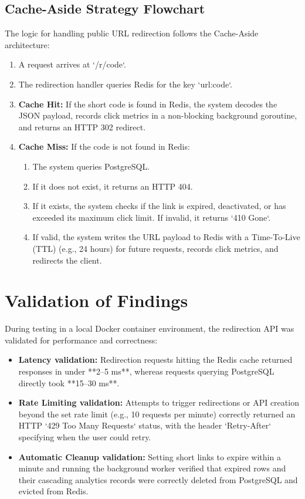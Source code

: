 \subsection{Cache-Aside Strategy Flowchart}
The logic for handling public URL redirection follows the Cache-Aside architecture:
\begin{enumerate}
    \item A request arrives at `/r/{code}`.
    \item The redirection handler queries Redis for the key `url:{code}`.
    \item \textbf{Cache Hit:} If the short code is found in Redis, the system decodes the JSON payload, records click metrics in a non-blocking background goroutine, and returns an HTTP 302 redirect.
    \item \textbf{Cache Miss:} If the code is not found in Redis:
    \begin{enumerate}
        \item The system queries PostgreSQL.
        \item If it does not exist, it returns an HTTP 404.
        \item If it exists, the system checks if the link is expired, deactivated, or has exceeded its maximum click limit. If invalid, it returns `410 Gone`.
        \item If valid, the system writes the URL payload to Redis with a Time-To-Live (TTL) (e.g., 24 hours) for future requests, records click metrics, and redirects the client.
    \end{enumerate}
\end{enumerate}

\section{Validation of Findings}
During testing in a local Docker container environment, the redirection API was validated for performance and correctness:
\begin{itemize}
    \item \textbf{Latency validation:} Redirection requests hitting the Redis cache returned responses in under **2–5 ms**, whereas requests querying PostgreSQL directly took **15–30 ms**.
    \item \textbf{Rate Limiting validation:} Attempts to trigger redirections or API creation beyond the set rate limit (e.g., 10 requests per minute) correctly returned an HTTP `429 Too Many Requests` status, with the header `Retry-After` specifying when the user could retry.
    \item \textbf{Automatic Cleanup validation:} Setting short links to expire within a minute and running the background worker verified that expired rows and their cascading analytics records were correctly deleted from PostgreSQL and evicted from Redis.
\end{itemize}
